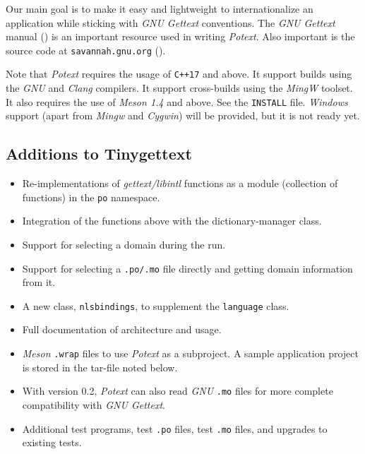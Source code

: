 \documentclass[
 11pt,
 twoside,
 a4paper,
 final                                 %
]{article}
\begin{document}
   Our main goal is to make it easy and lightweight to internationalize
   an application while sticking with \textsl{GNU Gettext}
   conventions.
   The \textsl{GNU Gettext} manual (\cite{gettextman}) is an important
   resource used in writing \textsl{Potext}.
   Also important is the source code at
   \texttt{savannah.gnu.org} (\cite{gettextcode}).

   Note that \textsl{Potext} requires the usage of \texttt{C++17}
   and above.
   It support builds using the \textsl{GNU} and \textsl{Clang} compilers.
   It support cross-builds using the \textsl{MingW} toolset.
   It also requires the use of \textsl{Meson 1.4} and above.
   See the \texttt{INSTALL} file.
   \textsl{Windows} support (apart from \textsl{Mingw} and
   \textsl{Cygwin}) will be provided, but it is not ready yet.

\subsection{Additions to Tinygettext}
\label{subsec:introduction_additions}

   \begin{itemize}
      \item Re-implementations of \textsl{gettext/libintl}
         functions as a module
         (collection of functions) in the \texttt{po} namespace.
      \item Integration of the functions above with the
         dictionary-manager class.
      \item Support for selecting a domain during the run.
      \item Support for selecting a \texttt{.po/.mo} file directly
         and getting domain information from it.
      \item A new class, \texttt{nlsbindings}, to supplement the
         \texttt{language} class.
      \item Full documentation of architecture and usage.
      \item \textsl{Meson} \texttt{.wrap} files to use \textsl{Potext}
         as a subproject.
         A sample application project is stored in the tar-file noted
         below.
      \item With version 0.2, \textsl{Potext} can also read
         \textsl{GNU} \texttt{.mo} files for more complete
         compatibility with \textsl{GNU Gettext}.
      \item Additional test programs, test \texttt{.po} files,
         test \texttt{.mo} files, and upgrades to existing tests.
   \end{itemize}
\end{document}
